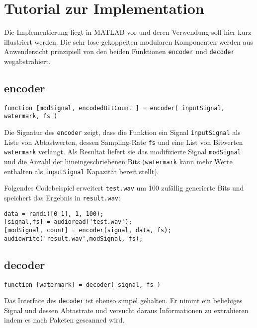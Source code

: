 \chapter{Tutorial zur Implementation}
\label{ch:tutorial}

Die Implementierung liegt in MATLAB vor und deren Verwendung soll hier kurz illustriert werden. Die sehr lose gekoppelten modularen Komponenten werden aus Anwendersicht prinzipiell von den beiden Funktionen \texttt{encoder} und \texttt{decoder} wegabstrahiert. 

\section{encoder}
\label{sec:encoder}

\begin{verbatim}
function [modSignal, encodedBitCount ] = encoder( inputSignal, watermark, fs )
\end{verbatim}

Die Signatur des \texttt{encoder} zeigt, dass die Funktion ein Signal \texttt{inputSignal} als Liste von Abtastwerten, dessen Sampling-Rate \texttt{fs} und eine List von Bitwerten \texttt{watermark} verlangt. Als Resultat liefert sie das modifizierte Signal \texttt{modSignal} und die Anzahl der hineingeschriebenen Bits (\texttt{watermark} kann mehr Werte enthalten als \texttt{inputSignal} Kapazität bereit stellt).

Folgendes Codebeispiel erweitert \texttt{test.wav} um 100 zufällig generierte Bits und speichert das Ergebnis in \texttt{result.wav}:

\begin{verbatim}
data = randi([0 1], 1, 100);
[signal,fs] = audioread('test.wav');
[modSignal, count] = encoder(signal, data, fs);
audiowrite('result.wav',modSignal, fs);
\end{verbatim}

\newpage


\section{decoder}

\begin{verbatim}
function [watermark] = decoder( signal, fs )
\end{verbatim}

Das Interface des \texttt{decoder} ist ebenso simpel gehalten. Er nimmt ein beliebiges Signal und dessen Abtastrate und versucht daraus Informationen zu extrahieren indem es nach Paketen gescanned wird. 

